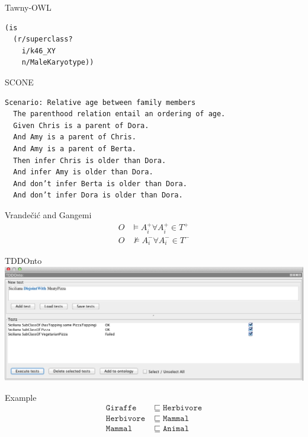 \documentclass[17pt,mathserif]{beamer}
\newcommand{\oclass}[1]{\ensuremath{\mathtt{#1}}}
\newcommand{\osub}{\sqsubseteq}
\begin{document}
\begin{frame}[fragile]{Tawny-OWL}
  \begin{lstlisting}[language=Lisp,basicstyle=\normalsize\ttfamily]
(is
  (r/superclass?
    i/k46_XY
    n/MaleKaryotype))
  \end{lstlisting}
\end{frame}

\begin{frame}[fragile]{SCONE}
  \begin{lstlisting}[basicstyle=\footnotesize\ttfamily]
Scenario: Relative age between family members
  The parenthood relation entail an ordering of age.
  Given Chris is a parent of Dora.
  And Amy is a parent of Chris.
  And Amy is a parent of Berta.
  Then infer Chris is older than Dora.
  And infer Amy is older than Dora.
  And don’t infer Berta is older than Dora.
  And don’t infer Dora is older than Dora.
  \end{lstlisting}
\end{frame}

\begin{frame}{Vrande\v{c}i\'c and Gangemi}
  \begin{align*}
    O &\models A_i^{+} \forall A_i^{+} \in T^{+} \\
    O &\not\models A_i^{-} \forall A_i^{-} \in T^{-}
  \end{align*}
\end{frame}

\begin{frame}{TDDOnto}
  \includegraphics[width=\textwidth]{tddonto}
\end{frame}

\begin{frame}[t]{Example}
  \begin{align*}
    \oclass{Giraffe} &\osub \oclass{Herbivore} \\
    \oclass{Herbivore} &\osub \oclass{Mammal} \\
    \oclass{Mammal} &\osub \oclass{Animal}
  \end{align*}
\end{frame}
\end{document}
